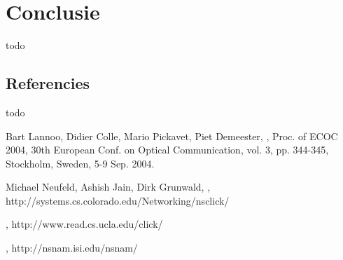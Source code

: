 \documentclass[twocolumn]{phdsymp} %
\begin{document}
\section{Conclusie}
todo

\subsection{Referencies}
todo


\nocite{*}



%
\begin{thebibliography}{1}
Bart Lannoo, Didier Colle, Mario Pickavet, Piet Demeester,
,
\newblock Proc. of ECOC 2004, 30th European Conf. on Optical Communication, vol. 3, pp. 344-345, Stockholm, Sweden, 5-9 Sep. 2004.

Michael Neufeld, Ashish Jain, Dirk Grunwald,
,
\newblock http://systems.cs.colorado.edu/Networking/nsclick/

,
\newblock http://www.read.cs.ucla.edu/click/

,
\newblock http://nsnam.isi.edu/nsnam/

\end{thebibliography}
%
\end{document}
